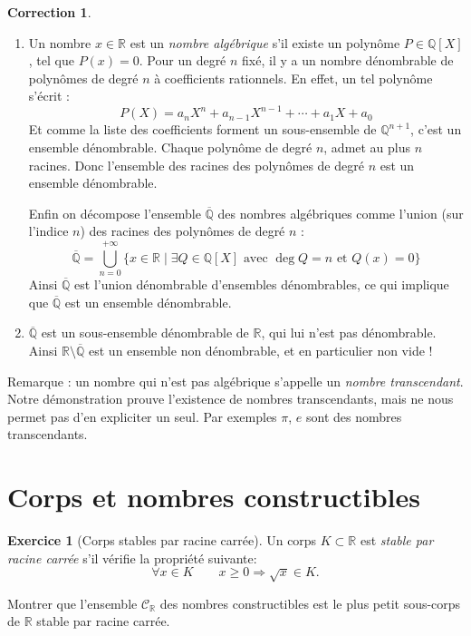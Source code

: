 \documentclass[11pt,a4paper]{article}
\newcommand{\Qq}{\mathbb{Q}} \newcommand{\Q}{\mathbb{Q}}
\newcommand{\Rr}{\mathbb{R}} \newcommand{\R}{\mathbb{R}}
\theoremstyle{definition}
\newtheorem{exo}{Exercice}
\newtheorem{cor}{Correction}
\newcommand{\exercice}[1]{} \newcommand{\finexercice}{}
\newcommand{\enonce}{\begin{exo}} \newcommand{\finenonce}{\end{exo}}
\newcommand{\correction}{\begin{cor}} \newcommand{\fincorrection}{\end{cor}}
\begin{document}
\correction
\begin{enumerate}
  \item Un nombre $x \in \Rr$ est un \emph{nombre algébrique}
  s'il existe un polynôme $P \in \Qq[X]$, tel que $P(x)=0$.
  Pour un degré $n$ fixé, il y a un nombre dénombrable de polynômes
  de degré $n$ à coefficients rationnels. En effet, un tel polynôme s'écrit :
  $$P(X) = a_nX^n + a_{n-1}X^{n-1}+\cdots +a_1X+a_0$$
  Et comme la liste des coefficients forment un sous-ensemble de $\Qq^{n+1}$, 
  c'est un ensemble  dénombrable.
  Chaque polynôme de degré $n$, admet au plus $n$ racines. Donc 
  l'ensemble des racines des polynômes de degré $n$ est un ensemble dénombrable.
  
  Enfin on décompose l'ensemble $\overline{\Qq}$ des nombres algébriques comme
  l'union (sur l'indice $n$) des racines des polynômes de degré $n$ :
  $$\overline{\Qq} = \bigcup_{n=0}^{+\infty} \Big\{ x \in \Rr \mid 
  \exists Q \in \Qq[X] \text{ avec } \deg Q = n \text{ et } Q(x)=0 \Big\}$$
  Ainsi $\overline{\Qq}$ est l'union dénombrable d'ensembles dénombrables, ce qui implique
  que $\overline{\Qq}$ est un ensemble dénombrable.
  
  \item $\overline{\Qq}$ est un sous-ensemble dénombrable de $\Rr$, qui lui n'est pas dénombrable.
  Ainsi $\Rr \setminus \overline{\Qq}$ est un ensemble non dénombrable, 
  et en particulier non vide !
\end{enumerate}

Remarque : un nombre qui n'est pas algébrique s'appelle un \emph{nombre transcendant}.
Notre démonstration prouve l'existence de nombres transcendants, mais ne nous permet 
pas d'en expliciter un seul. Par exemples $\pi$, $e$ sont des nombres transcendants.

\fincorrection

\finexercice


\section{Corps et nombres constructibles}

\exercice{}
\enonce[Corps stables par racine carrée]
Un corps $K \subset \Rr$ est \emph{stable par racine carrée} s'il vérifie la propriété suivante:
$$\forall x \in K \qquad   x  \ge 0 \Rightarrow \sqrt x \in K.$$

Montrer que l'ensemble $\mathcal{C}_\Rr$ des nombres constructibles est 
le plus petit sous-corps de $\Rr$ stable par racine carrée.
\finenonce
\end{document}
